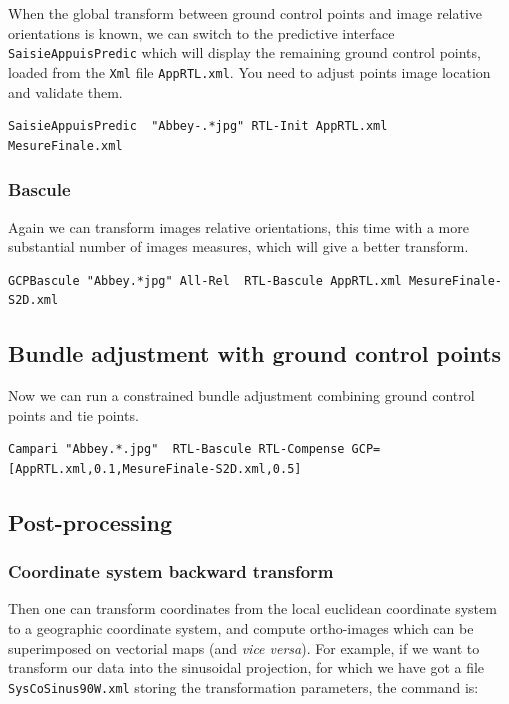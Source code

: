 When the global transform between ground control points and image relative orientations is known, we can switch to the predictive interface {\tt SaisieAppuisPredic} which will display the remaining ground control points, loaded from the {\tt Xml} file {\tt AppRTL.xml}.
You need to adjust points image location and validate them.

\begin{verbatim}
SaisieAppuisPredic  "Abbey-.*jpg" RTL-Init AppRTL.xml  MesureFinale.xml
\end{verbatim}

\subsubsection{Bascule}

Again we can transform images relative orientations, this time with a more substantial number of images measures, which will give a better transform.
\begin{verbatim}
GCPBascule "Abbey.*jpg" All-Rel  RTL-Bascule AppRTL.xml MesureFinale-S2D.xml
\end{verbatim}


\subsection{Bundle adjustment with ground control points}

Now we can run a constrained bundle adjustment combining ground control points and tie points.

\begin{verbatim}
Campari "Abbey.*.jpg"  RTL-Bascule RTL-Compense GCP=[AppRTL.xml,0.1,MesureFinale-S2D.xml,0.5]
\end{verbatim}


\subsection{Post-processing}

\subsubsection{Coordinate system backward transform}

Then one can transform coordinates from the local euclidean coordinate system to a geographic coordinate system, and compute ortho-images which can be superimposed on vectorial maps (and \textit{vice versa}). 
For example, if we want to transform our data into the sinusoidal projection, for which we have got a file {\tt SysCoSinus90W.xml} storing the transformation parameters, the command is:

